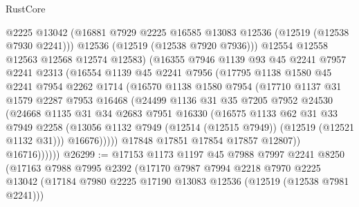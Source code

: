 \begin{lexlean}{RustCore}
\begin{coremodule}
                  @2225
                  @13042
                  (@16881 @7929 @2225 @16585 @13083 @12536 (@12519 (@12538 @7930 @2241)))
                  @12536
                  (@12519 (@12538 @7920 @7936)))
                @12554
                @12558
                @12563
                @12568
                @12574
                @12583)
              (@16355
                @7946
                @1139
                @93
                @45
                @2241
                @7957
                @2241
                @2313
                (@16554
                  @1139
                  @45
                  @2241
                  @7956
                  (@17795
                    @1138
                    @1580
                    @45
                    @2241
                    @7954
                    @2262
                    @1714
                    (@16570
                      @1138
                      @1580
                      @7954
                      (@17710
                        @1137
                        @31
                        @1579
                        @2287
                        @7953
                        @16468
                        (@24499
                          @1136
                          @31
                          @35
                          @7205
                          @7952
                          @24530
                          (@24668
                            @1135
                            @31
                            @34
                            @2683
                            @7951
                            @16330
                            (@16575
                              @1133
                              @62
                              @31
                              @33
                              @7949
                              @2258
                              (@13056
                                @1132
                                @7949
                                (@12514 (@12515 @7949))
                                (@12519 (@12521 @1132 @31)))
                              @16676)))))
                    @17848
                    @17851
                    @17854
                    @17857
                    @12807))
                @16716))))))
@26299 := @17153
    @1173
    @1197
    @45
    @7988
    @7997
    @2241
    @8250
    (@17163
      @7988
      @7995
      @2392
      (@17170
        @7987
        @7994
        @2218
        @7970
        @2225
        @13042
        (@17184 @7980 @2225 @17190 @13083 @12536 (@12519 (@12538 @7981 @2241)))

\end{coremodule}
\end{lexlean}
